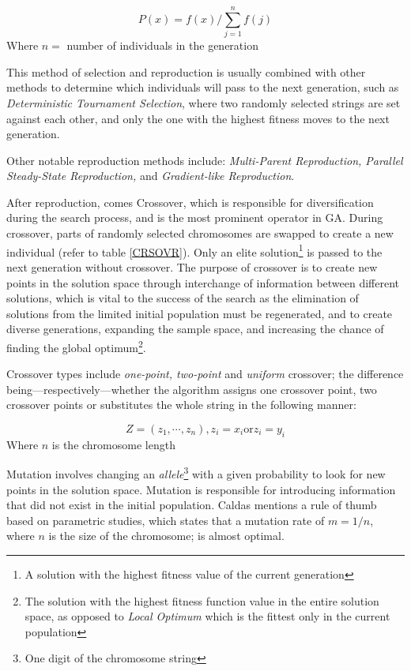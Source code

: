 \begin{equation}
P(x)=f(x)/ \sum\limits_{j=1}^n f(j) 
\label{eqn:BiasedRoulette}
\end{equation}
\small Where $n=$ number of individuals in the generation
\normalsize

This method of selection and reproduction is usually combined with other methods to determine which individuals will pass to the next generation, such as \emph{Deterministic Tournament Selection}, where two randomly selected strings are set against each other, and only the one with the highest fitness moves to the next generation.

Other notable reproduction methods include: \emph{Multi-Parent Reproduction, Parallel Steady-State Reproduction,} and \emph{Gradient-like Reproduction}.

After reproduction, comes Crossover, which is responsible for diversification during the search process, and is the most prominent operator in GA. During crossover, parts of randomly selected chromosomes are swapped to create a new individual (refer to table \ref{CRSOVR}). Only an elite solution\footnote{A solution with the highest fitness value of the current generation} is passed to the next generation without crossover. The purpose of crossover is to create new points in the solution space through interchange of information between different solutions, which is vital to the success of the search as the elimination of solutions from the limited initial population must be regenerated, and to create diverse generations, expanding the sample space, and increasing the chance of finding the global optimum\footnote{The solution with the highest fitness function value in the entire solution space, as opposed to \emph{Local Optimum} which is the fittest only in the current population}.

Crossover types include \emph{one-point, two-point} and \emph{uniform} crossover; the difference being---respectively---whether the algorithm assigns one crossover point, two crossover points or substitutes the whole string in the following manner:

\begin{equation}
Z=(z_1,\cdots,z_n), z_i=x_i \text{or} z_i=y_i
\label{eqn:UniformCross}
\end{equation}
\small Where $n$ is the chromosome length
\normalsize

Mutation involves changing an \emph{allele}\footnote{One digit of the chromosome string} with a given probability to look for new points in the solution space. Mutation is responsible for introducing information that did not exist in the initial population. Caldas \cite{caldas01} mentions a rule of thumb based on parametric studies, which states that a mutation rate of $m=1/n$, where $n$ is the size of the chromosome; is almost optimal.

